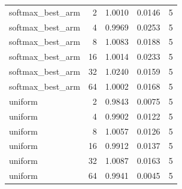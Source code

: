 \begin{table}[t]
\begin{tabular}{lrrrr}
softmax\_best\_arm & 2 & 1.0010 & 0.0146 & 5 \\
softmax\_best\_arm & 4 & 0.9969 & 0.0253 & 5 \\
softmax\_best\_arm & 8 & 1.0083 & 0.0188 & 5 \\
softmax\_best\_arm & 16 & 1.0014 & 0.0233 & 5 \\
softmax\_best\_arm & 32 & 1.0240 & 0.0159 & 5 \\
softmax\_best\_arm & 64 & 1.0002 & 0.0168 & 5 \\
uniform & 2 & 0.9843 & 0.0075 & 5 \\
uniform & 4 & 0.9902 & 0.0122 & 5 \\
uniform & 8 & 1.0057 & 0.0126 & 5 \\
uniform & 16 & 0.9912 & 0.0137 & 5 \\
uniform & 32 & 1.0087 & 0.0163 & 5 \\
uniform & 64 & 0.9941 & 0.0045 & 5 \\
\bottomrule
\end{tabular}
\end{table}
